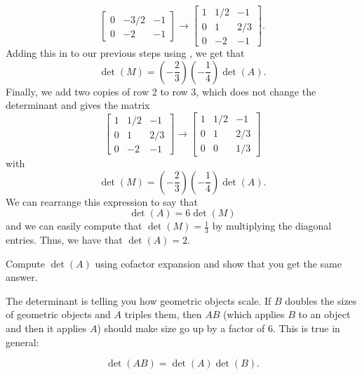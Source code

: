 \documentclass{ximera}
\begin{document}
\begin{exampleSol}
\[\begin{bmatrix}
            0 & -3/2  & -1\\
            0 & -2 & -1
        \end{bmatrix} 
        \rightarrow 
        \begin{bmatrix}  
            1  & 1/2 & -1\\
            0 & 1  & 2/3\\
            0 & -2 & -1
        \end{bmatrix}. 
    \] 
    Adding this in to our previous steps using , we get that 
    \[ 
        \det(M) = \left(-\frac{2}{3} \right) \left( -\frac{1}{4} \right) \det(A). 
    \] 
    Finally, we add two copies of row 2 to row 3, which does not change the determinant and gives the matrix
    \[ 
        \begin{bmatrix}  
            1  & 1/2 & -1\\
            0 & 1  & 2/3\\
            0 & -2 & -1
        \end{bmatrix} 
        \rightarrow
        \begin{bmatrix}  
            1  & 1/2 & -1\\
            0 & 1  & 2/3\\
            0 & 0 & 1/3
        \end{bmatrix} 
    \] 
    with 
    \[ 
        \det(M) = \left(-\frac{2}{3} \right) \left( -\frac{1}{4} \right) \det(A) . 
    \]
    We can rearrange this expression to say that
    \[ 
        \det(A) = 6\det(M) 
    \] 
    and we can easily compute that $\det(M) = \frac{1}{3}$ by multiplying the diagonal entries. Thus, we have that $\det(A) = 2$.
\end{exampleSol}

\begin{exercise}
    Compute $\det(A)$ using cofactor expansion and show that you get the same answer. 
\end{exercise}

The determinant is telling you how geometric objects scale. If $B$ doubles the sizes of geometric objects and $A$ triples them, then $AB$ (which applies $B$ to an object and then it applies $A$) should make size go up by a factor of $6$.  This is true in general:

\begin{theorem}{}
    \begin{equation*}
        \det(AB) = \det(A)\det(B) .
    \end{equation*}
\end{theorem}
\end{document}
